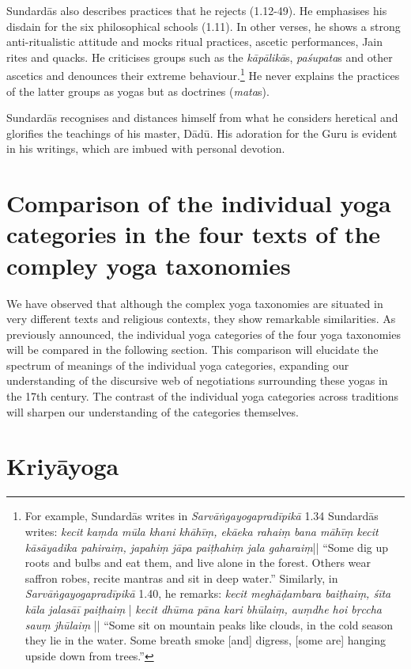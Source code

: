 Sundardās also describes practices that he rejects (1.12-49). He emphasises his disdain for the six philosophical schools (1.11). In other verses, he shows a strong anti-ritualistic attitude and mocks ritual practices, ascetic performances, Jain rites and quacks. He criticises groups such as the \textit{kāpālikā}s, \textit{paśupata}s and other ascetics and denounces their extreme behaviour.\footnote{For example, Sundardās writes in \emph{Sarvāṅgayogapradīpikā} 1.34 Sundardās writes: 
\textit{kecit kaṃda mūla khani khāhīṃ, ekāeka rahaiṃ bana māhīṃ} \textit{kecit kāsāyadika pahiraiṃ, japahiṃ jāpa paiṭhahiṃ jala gaharaiṃ}|| ``Some dig up roots and bulbs and eat them, and live alone in the forest. Others wear saffron robes, recite mantras and sit in deep water.'' Similarly, in \emph{Sarvāṅgayogapradīpikā} 1.40, he remarks: \textit{kecit meghāḍambara baiṭhaiṃ, śīta kāla jalasāī paiṭhaiṃ} | \textit{kecit dhūma pāna kari bhūlaiṃ, auṃdhe hoi bṛccha sauṃ jhūlaiṃ} || ``Some sit on mountain peaks like clouds, in the cold season they lie in the water. Some breath smoke [and] digress, [some are] hanging upside down from trees.''} He never explains the practices of the latter groups as yogas but as doctrines (\textit{mata}s).

Sundardās recognises and distances himself from what he considers heretical and glorifies the teachings of his master, Dādū. His adoration for the Guru is evident in his writings, which are imbued with personal devotion.

\section{Comparison of the individual yoga categories in the four texts of the compley yoga taxonomies}

We have observed that although the complex yoga taxonomies are situated in very different texts and religious contexts, they show remarkable similarities. As previously announced, the individual yoga categories of the four yoga taxonomies will be compared in the following section. This comparison will elucidate the spectrum of meanings of the individual yoga categories, expanding our understanding of the discursive web of negotiations surrounding these yogas in the 17th century. The contrast of the individual yoga categories across traditions will sharpen our understanding of the categories themselves.

\section{Kriyāyoga}

